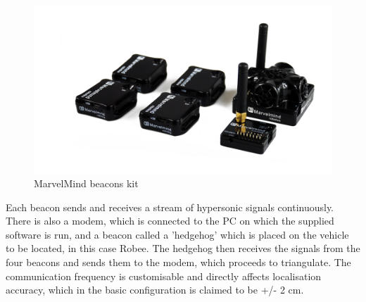 \begin{figure}[H]
    \centering
    \includegraphics[scale=0.25]{Images/Chapter 3/beacon.jpg}
    \caption{MarvelMind beacons kit}
    \label{fig:beacon}
\end{figure}

Each beacon sends and receives a stream of hypersonic signals continuously. There is also a modem, which is connected to the PC on which the supplied software is run, and a beacon called a 'hedgehog' which is placed on the vehicle to be located, in this case Robee. The hedgehog then receives the signals from the four beacons and sends them to the modem, which proceeds to triangulate.
The communication frequency is customisable and directly affects localisation accuracy, which in the basic configuration is claimed to be +/- 2 cm.
